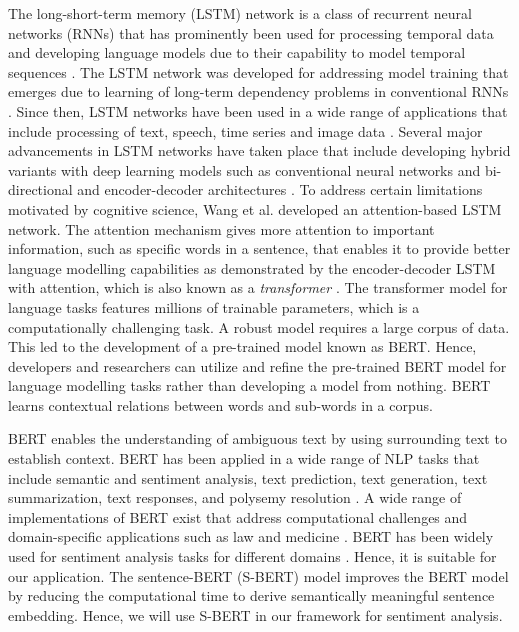 \documentclass[5p,times]{elsarticle}
\begin{document}

The long-short-term memory (LSTM) network is a class of recurrent neural networks (RNNs) that  has prominently been used for processing temporal  data and developing language models due to their capability to model temporal sequences  \cite{hochreiter1997long}. The LSTM network was developed for addressing model training that emerges due to learning of long-term dependency problems in conventional RNNs \cite{hochreiter1998vanishing}. Since then, LSTM networks have been used in a wide range of applications that include processing of text, speech, time series and image data \cite{yu2019review}. Several major advancements in LSTM networks have taken place that include developing hybrid variants with deep learning models such as conventional neural networks and bi-directional and encoder-decoder architectures \cite{van2020review}. To address certain limitations motivated by cognitive science, Wang et al. \cite{wang2016attention}  developed an attention-based LSTM network. The attention mechanism gives more attention to important information, such as specific words in a sentence, that enables it to provide better language modelling capabilities as demonstrated by the encoder-decoder LSTM  with attention, which is also known as a \textit{transformer}  \cite{vaswani2017attention}. The transformer model for language tasks features millions of trainable parameters, which is a computationally challenging task. A robust model requires a large corpus of data. This led to the development of a pre-trained model known as BERT\cite{devlin2018bert}. Hence, developers and researchers can utilize and refine the pre-trained  BERT model for language modelling tasks rather than developing a model from nothing. 
BERT learns contextual relations between words and sub-words in a corpus.

  
 BERT enables the understanding of ambiguous text by using surrounding text to establish context. BERT has been applied in a wide range of NLP tasks that include semantic and sentiment analysis, text prediction, text generation, text summarization, text responses, and polysemy resolution \cite{koroteev2021bert}. A wide range of implementations of BERT exist that address computational challenges  and  domain-specific applications \cite{zhou2023comprehensive} such as law and medicine \cite{
chalkidis2020legal,rasmy2021med}. BERT has been widely used for sentiment analysis tasks for different domains \cite{acheampong2021transformer}. Hence, it is suitable for our application. The sentence-BERT (S-BERT)\cite{reimers2019sentence} model improves the BERT model by reducing the computational time to derive semantically meaningful sentence embedding. Hence, we will use S-BERT in our framework for sentiment analysis. 
\end{document}
